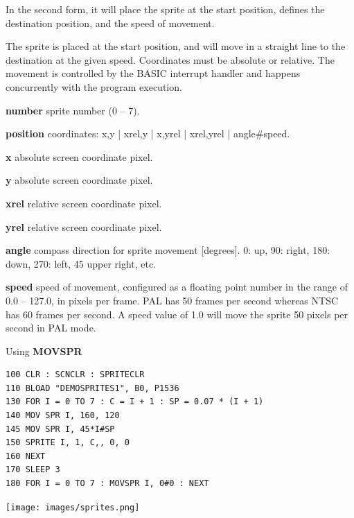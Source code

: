 \begin{description}[leftmargin=2cm,style=nextline]
                  In the second form, it will place the sprite at the start position, defines the destination position, and the speed of movement.

                  The sprite is placed at the start position, and will move in a straight line to the destination at the given speed. Coordinates must be absolute or relative. The movement is controlled by the BASIC interrupt handler and happens concurrently with the program execution.

                  {\bf number} sprite number (0 -- 7).

                  {\bf position} coordinates: x,y | xrel,y | x,yrel | xrel,yrel | angle\#speed.

                  {\bf x} absolute screen coordinate pixel.

                  {\bf y} absolute screen coordinate pixel.

                  {\bf xrel} relative screen coordinate pixel.

                  {\bf yrel} relative screen coordinate pixel.

                  {\bf angle} compass direction for sprite movement [degrees]. 0: up, 90: right, 180: down, 270: left, 45 upper right, etc.

                  {\bf speed} speed of movement, configured as a floating point number in the range of 0.0 -- 127.0, in pixels per frame. PAL has 50 frames per second whereas NTSC has 60 frames per second. A speed value of 1.0 will move the sprite 50 pixels per second in PAL mode.

\item [Example:]  Using {\bf MOVSPR}

\begin{tcolorbox}[colback=black,coltext=white]
\verbatimfont{\codefont}
\begin{verbatim}
100 CLR : SCNCLR : SPRITECLR
110 BLOAD "DEMOSPRITES1", B0, P1536
130 FOR I = 0 TO 7 : C = I + 1 : SP = 0.07 * (I + 1)
140 MOV SPR I, 160, 120
145 MOV SPR I, 45*I#SP
150 SPRITE I, 1, C,, 0, 0
160 NEXT
170 SLEEP 3
180 FOR I = 0 TO 7 : MOVSPR I, 0#0 : NEXT
\end{verbatim}
\end{tcolorbox}

\item \begin{center}\texttt{[image: images/sprites.png]}\end{center}

\end{description}

